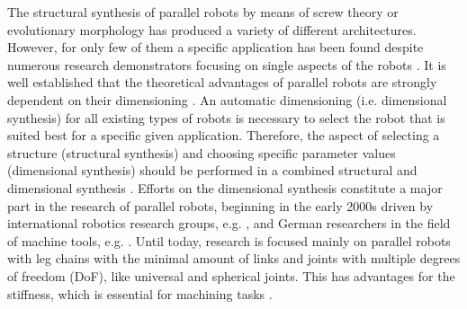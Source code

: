 \documentclass[fleqn,a4paper,10pt]{article}
\begin{document}
\begin{multicols}{2}
The structural synthesis of parallel robots by means of screw theory \cite{KongGos2007} or evolutionary morphology \cite{Gogu2008} has produced a variety of different architectures.
However, for only few of them a specific application has been found despite numerous research demonstrators focusing on single aspects of the robots \cite{Merlet2006}.
It is well established that the theoretical advantages of parallel robots are strongly dependent on their dimensioning \cite{Merlet2006}. %
An automatic dimensioning (i.e. dimensional synthesis) for all existing types of robots is necessary to select the robot that is suited best for a specific given application.
Therefore, the aspect of selecting a structure (structural synthesis) and choosing specific parameter values (dimensional synthesis) should be performed in a combined structural and dimensional synthesis \cite{Krefft2006}.
Efforts on the dimensional synthesis constitute a major part in the research of parallel robots, beginning in the early 2000s driven by international robotics research groups, e.g. \cite{Merlet2006,CarboneOttCec2007}, and German researchers in the field of machine tools, e.g. \cite{MbarekNefCor2005,Krefft2006,FrindtKreHes2010}.
Until today, research is focused mainly on parallel robots with leg chains with the minimal amount of links and joints with multiple degrees of freedom (DoF), like universal and spherical joints.
This has advantages for the stiffness, which is essential for machining tasks \cite{MbarekNefCor2005}.


\begin{figure}[b]
    \centering
    \vspace{-0.3cm} %
    
    \vspace{-0.5cm} %
    \label{fig:details_kindyn}
\end{figure}

%


\end{multicols}
\end{document}
